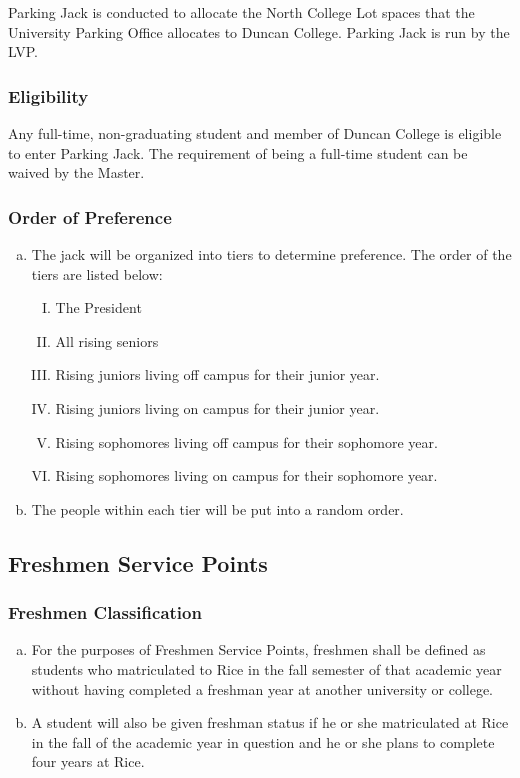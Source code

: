 \documentclass[USletter,12pt]{article}
\begin{document}
Parking Jack is conducted to allocate the North College Lot spaces that the University Parking Office allocates to Duncan College.  Parking Jack is run by the LVP.

\subsubsection{Eligibility}
Any full-time, non-graduating student and member of Duncan College is eligible to enter Parking Jack.  The requirement of being a full-time student can be waived by the Master.

\subsubsection{Order of Preference}
\begin{enumerate}[(a)]
\item The jack will be organized into tiers to determine preference.  The order of the tiers are listed below:
	\begin{enumerate}[(I)]
	\item The President
	\item All rising seniors
	\item Rising juniors living off campus for their junior year.
	\item Rising juniors living on campus for their junior year.
	\item Rising sophomores living off campus for their sophomore year.
	\item Rising sophomores living on campus for their sophomore year.
	\end{enumerate}
\item The people within each tier will be put into a random order.
\end{enumerate}


\subsection{Freshmen Service Points}


\subsubsection{Freshmen Classification}
\begin{enumerate}[(a)]
\item For the purposes of Freshmen Service Points, freshmen shall be defined as students who matriculated to Rice in the fall semester of that academic year without having completed a freshman year at another university or college.
\item A student will also be given freshman status if he or she matriculated at Rice in the fall of the academic year in question and he or she plans to complete four years at Rice.
\end{enumerate}
\end{document}
